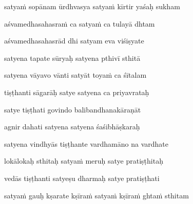satya\.m sopānam ūrdhvasya satya\.m kīrtir yaśaḥ sukham \veg\dontdisplaylinenum

aśvamedhasahasra\.m ca satya\.m ca tulayā dhtam\thinspace{\dandab} \dontdisplaylinenum

aśvamedhasahasrād dhi satyam eva viśiṣyate \veg\dontdisplaylinenum

satyena tapate sūryaḥ satyena pthivī sthitā\thinspace{\dandab} \dontdisplaylinenum

satyena vāyavo vānti satyāt toya\.m ca śītalam \veg\dontdisplaylinenum

tiṣṭhanti sāgarāḥ satye satyena ca priyavrataḥ\thinspace{\dandab} \dontdisplaylinenum

satye tiṣṭhati govindo balibandhanakāraṇāt \veg\dontdisplaylinenum

agnir dahati satyena satyena śaśibhāṣkaraḥ\thinspace{\dandab} \dontdisplaylinenum

satyena vindhyās tiṣṭhante vardhamāno na vardhate \veg\dontdisplaylinenum

lokālokaḥ sthitaḥ satya\.m meruḥ satye pratiṣṭhitaḥ\thinspace{\dandab} \dontdisplaylinenum

vedās tiṣṭhanti satyeṣu dharmaḥ satye pratiṣṭhati \veg\dontdisplaylinenum

satya\.m gauḥ kṣarate kṣīra\.m satya\.m kṣīra\.m ghta\.m sthitam\thinspace{\dandab} \dontdisplaylinenum


